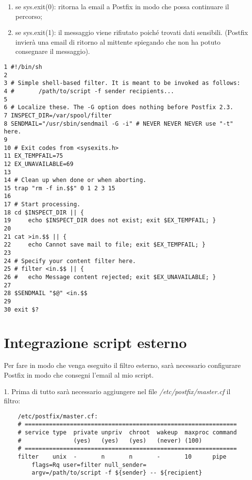     
    \begin{enumerate}
        \item se sys.exit(0): ritorna la email a Postfix in modo che possa continuare il percorso;
        \item se sys.exit(1): il messaggio viene rifiutato poiché trovati dati sensibili. (Postfix invierà una 
        email di ritorno al mittente spiegando che non ha potuto consegnare il messaggio). 
    \end{enumerate}

    \begin{verbatim}
1 #!/bin/sh
2 
3 # Simple shell-based filter. It is meant to be invoked as follows:
4 #       /path/to/script -f sender recipients...
5 
6 # Localize these. The -G option does nothing before Postfix 2.3.
7 INSPECT_DIR=/var/spool/filter
8 SENDMAIL="/usr/sbin/sendmail -G -i" # NEVER NEVER NEVER use "-t" here.
9 
10 # Exit codes from <sysexits.h>
11 EX_TEMPFAIL=75
12 EX_UNAVAILABLE=69
13 
14 # Clean up when done or when aborting.
15 trap "rm -f in.$$" 0 1 2 3 15
16 
17 # Start processing.
18 cd $INSPECT_DIR || {
19     echo $INSPECT_DIR does not exist; exit $EX_TEMPFAIL; }
20 
21 cat >in.$$ || { 
22     echo Cannot save mail to file; exit $EX_TEMPFAIL; }
23 
24 # Specify your content filter here.
25 # filter <in.$$ || {
26 #   echo Message content rejected; exit $EX_UNAVAILABLE; }
27 
28 $SENDMAIL "$@" <in.$$
29 
30 exit $?
    \end{verbatim}

    \section{Integrazione script esterno}
    Per fare in modo che venga eseguito il filtro esterno, sarà necessario configurare Postfix in modo
    che consegni l'email al mio script.

    1. Prima di tutto sarà necessario aggiungere nel file \textit{/etc/postfix/master.cf} il filtro:

    \begin{verbatim}
    /etc/postfix/master.cf:
    # =============================================================
    # service type  private unpriv  chroot  wakeup  maxproc command
    #               (yes)   (yes)   (yes)   (never) (100)
    # =============================================================
    filter    unix  -       n       n       -       10      pipe
        flags=Rq user=filter null_sender=
        argv=/path/to/script -f ${sender} -- ${recipient}
    \end{verbatim}

